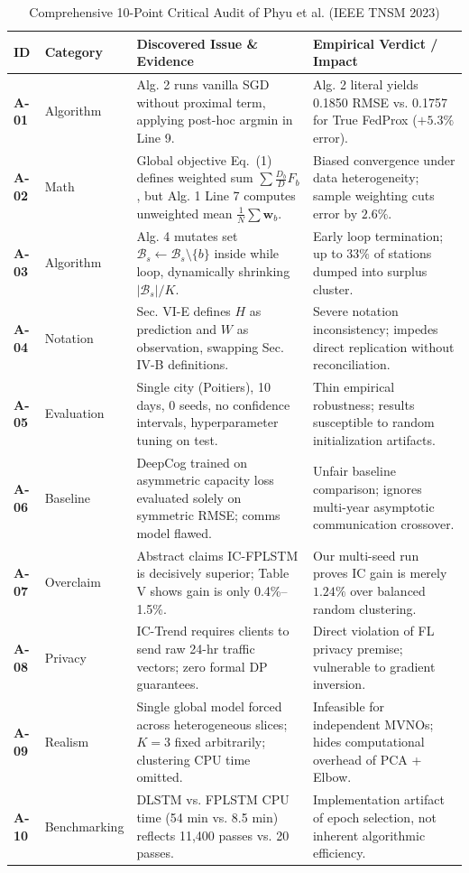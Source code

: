 \documentclass[10pt,journal,compsoc,twocolumn]{article}
\begin{document}
\begin{table}[t]
\centering
\small
\caption{Comprehensive 10-Point Critical Audit of Phyu et al. (IEEE TNSM 2023)}
\label{tab:audit_matrix}
\begin{tabularx}{\textwidth}{llp{7.2cm}X}
\toprule
\textbf{ID} & \textbf{Category} & \textbf{Discovered Issue \& Evidence} & \textbf{Empirical Verdict / Impact} \\
\midrule
\textbf{A-01} & Algorithm & Alg. 2 runs vanilla SGD without proximal term, applying post-hoc argmin in Line 9. & Alg. 2 literal yields 0.1850 RMSE vs. 0.1757 for True FedProx ($+5.3\%$ error). \\
\textbf{A-02} & Math & Global objective Eq.~(1) defines weighted sum $\sum \frac{D_b}{D} F_b$, but Alg. 1 Line 7 computes unweighted mean $\frac{1}{N} \sum \mathbf{w}_b$. & Biased convergence under data heterogeneity; sample weighting cuts error by $2.6\%$. \\
\textbf{A-03} & Algorithm & Alg. 4 mutates set $\mathcal{B}_s \leftarrow \mathcal{B}_s \setminus \{b\}$ inside while loop, dynamically shrinking $|\mathcal{B}_s|/K$. & Early loop termination; up to $33\%$ of stations dumped into surplus cluster. \\
\textbf{A-04} & Notation & Sec. VI-E defines $H$ as prediction and $W$ as observation, swapping Sec. IV-B definitions. & Severe notation inconsistency; impedes direct replication without reconciliation. \\
\textbf{A-05} & Evaluation & Single city (Poitiers), 10 days, 0 seeds, no confidence intervals, hyperparameter tuning on test. & Thin empirical robustness; results susceptible to random initialization artifacts. \\
\textbf{A-06} & Baseline & DeepCog trained on asymmetric capacity loss evaluated solely on symmetric RMSE; comms model flawed. & Unfair baseline comparison; ignores multi-year asymptotic communication crossover. \\
\textbf{A-07} & Overclaim & Abstract claims IC-FPLSTM is decisively superior; Table V shows gain is only 0.4\%--1.5\%. & Our multi-seed run proves IC gain is merely $1.24\%$ over balanced random clustering. \\
\textbf{A-08} & Privacy & IC-Trend requires clients to send raw 24-hr traffic vectors; zero formal DP guarantees. & Direct violation of FL privacy premise; vulnerable to gradient inversion. \\
\textbf{A-09} & Realism & Single global model forced across heterogeneous slices; $K=3$ fixed arbitrarily; clustering CPU time omitted. & Infeasible for independent MVNOs; hides computational overhead of PCA + Elbow. \\
\textbf{A-10} & Benchmarking & DLSTM vs. FPLSTM CPU time (54 min vs. 8.5 min) reflects 11,400 passes vs. 20 passes. & Implementation artifact of epoch selection, not inherent algorithmic efficiency. \\
\bottomrule
\end{tabularx}
\end{table}
\end{document}
